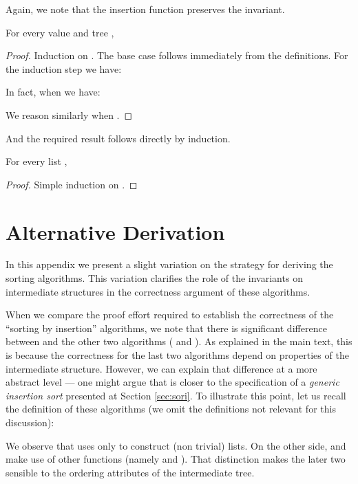 \documentclass[a4paper,11pt]{llncs}
\begin{document}
Again, we note that the insertion function preserves the invariant.

\begin{proposition}
For every value  and tree ,

\end{proposition}
\begin{proof}
  Induction on . The base case follows immediately from the
  definitions. For the induction step we have:

\noindent In fact, when  we have:

\noindent We reason similarly when .
\end{proof}

And the required result follows directly by induction.

\begin{corollary}
\label{prop:buildbst}
For every list ,

\end{corollary}
\begin{proof}
  Simple induction on .
\end{proof}

\newpage

\section{Alternative Derivation}
\label{app:sec:altern-deriv}

In this appendix we present a slight variation on the strategy for
deriving the sorting algorithms. This variation clarifies the role of
the invariants on intermediate structures in the correctness argument
of these algorithms.

When we compare the proof effort required to establish the correctness
of the ``sorting by insertion'' algorithms, we note that there is
significant difference between  and the other two
algorithms ( and ). As explained in the main text,
this is because the correctness for the last two algorithms depend on
properties of the intermediate structure. However, we can explain that
difference at a more abstract level --- one might argue that
 is closer to the specification of a \emph{generic
  insertion sort} presented at Section \ref{sec:sori}. To illustrate
this point, let us recall the definition of these algorithms (we omit
the definitions not relevant for this discussion):

\noindent We observe that  uses only  to construct
(non trivial) lists. On the other side,  and  make
use of other functions (namely  and ). That distinction
makes the later two sensible to the ordering attributes of the
intermediate tree.
\end{document}
